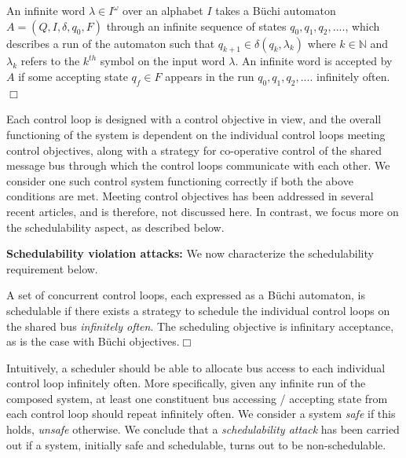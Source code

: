 \begin{definition}
An infinite word $\lambda \in I ^ \omega$ over an alphabet $I$ takes a B\"{u}chi automaton $A = (Q,I,\delta,q_0,F)$ through an infinite sequence of states $ q_0, q_1, q_2, ....$, which describes a run of
the automaton such that $ q_{k+1} \in \delta(q_k, \lambda_k)$ where $k \in \mathbb{N}$ and $\lambda_k$ refers to the $k^{th}$ symbol on the input word $\lambda$. An infinite word is accepted by $A$ if some 
accepting state $q_f \in F $ appears in the run $ q_0, q_1, q_2, ....$ 
infinitely often. $\Box$ \\
\end{definition}

\noindent
Each control loop is designed with a control objective in view, and the overall functioning of the system is dependent on the individual control loops meeting control objectives, 
along with a strategy for co-operative control of the shared message bus through which the control loops communicate with each other. We consider one such control system functioning 
correctly if both the above conditions are met. Meeting control objectives has been addressed in several recent articles, and is therefore, not discussed here. In contrast,
we focus more on the schedulability aspect, as described below. 

\textbf{Schedulability violation attacks:} 
\noindent
We now characterize the schedulability requirement below. 

\begin{definition}
A set of concurrent control loops, each expressed as a B\"{u}chi automaton, is schedulable if there exists a strategy to schedule the individual control loops on the shared bus {\em infinitely often}.
The scheduling objective is infinitary acceptance, as is the case with B\"{u}chi objectives.$\Box$ \\
\end{definition}

\noindent
Intuitively, a scheduler should be able to allocate bus access to each individual control loop infinitely often. More specifically, given any infinite run of the composed system, 
at least one constituent  bus accessing / accepting state from each control loop should repeat infinitely often. We consider a system {\em safe} if this holds, {\em unsafe} otherwise. 
We conclude that a {\em schedulability attack} has been carried out if a system,  initially safe and schedulable, turns out to be non-schedulable. \\
%

